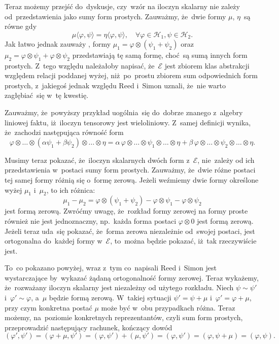 \documentclass[a4paper,11pt]{article}
\newcommand{\ld}{\ldots}
\newcommand{\mc}{\mathcal}
\newcommand{\al}{\alpha}
\newcommand{\vp}{\varphi}
\newcommand{\Hc}{\mc{H}}
\newcommand{\ot}{\otimes}
\newcommand{\lket}{\langle}
\newcommand{\rket}{\rangle}
\begin{document}
Teraz możemy przejść do~dyskusje, %
czy~wzór na iloczyn skalarny nie zależy od~przedstawienia jako sumy
form prostych. Zauważmy, że~dwie formy $\mu$, $\eta$~są równe gdy
\begin{displaymath}
  \mu\lket \vp, \psi \rket = \eta\lket \vp, \psi \rket,
  \quad \forall \vp \in \Hc_{ 1 }, \psi \in \Hc_{ 2 }.
\end{displaymath}
Jak łatwo jednak zauważy %
, formy $\mu_{ 1 } = \vp \ot ( \psi_{ 1 } + \psi_{ 2 } )$
oraz~$\mu_{ 2 } = \vp \ot \psi_{ 1 } + \vp \ot \psi_{ 2 }$
przedstawiają tę samą formę, choć~są sumą innych form prostych. Z~tego
względu należałoby napisać, że~$\mc{E}$ jest zbiorem klas abstrakcji
względem relacji poddanej wyżej, niż~po~prostu zbiorem sum
odpowiednich form prostych, z~jakiegoś jednak względu Reed i~Simon
uznali, że~nie warto zagłębiać~się w~tę kwestię.

Zauważmy, że~powyższy przykład uogólnia~się do~dobrze znanego
z~algebry liniowej faktu, iż~iloczyn tensorowy jest wieloliniowy.
Z~samej definicji wynika, że~zachodzi następująca równość form
\begin{displaymath}
  \vp \ot \ld \ot ( \al \psi_{ 1 } + \beta \psi_{ 2 } ) \ot \ld \ot \eta
  = \al \, \vp \ot \ld \ot \psi_{ 1 } \ot \ld \ot \eta
  + \beta \, \vp \ot \ld \ot \psi_{ 2 } \ot \ld \ot \eta.
\end{displaymath}

Musimy teraz pokazać, że~iloczyn skalarnych dwóch form z~$\mc{E}$,
nie~zależy od ich przedstawienia w~postaci sumy form prostych.
Zauważmy, że~dwie różne postaci tej samej formy różnią się o~formę
zerową. Jeżeli weźmiemy dwie formy określone wyżej $\mu_{ 1 }$
i~$\mu_{ 2 }$, to ich różnica:
\begin{displaymath}
  \mu_{ 1 } - \mu_{ 2 } = \vp \ot ( \psi_{ 1 } + \psi_{ 2 } )
  - \vp \ot \psi_{ 1 } - \vp \ot \psi_{ 2 }
\end{displaymath}
jest formą zerową. Zwróćmy uwagę, że~rozkład formy zerowej na formy
proste również nie jest jednoznaczny, np.~każda forma postaci
$\vp \ot 0$ jest formą zerową. Jeżeli teraz uda~się pokazać, że~forma
zerowa niezależnie od~swojej postaci, jest ortogonalna do~każdej formy
w~$\mc{E}$, to~można będzie pokazać, iż~tak rzeczywiście jest.

To~co pokazano powyżej, wraz z~tym co~napisali Reed i~Simon jest
wystarczające by~wykazać żądaną ortogonalność formy zerowej. Teraz
wykażemy, że~rozważany iloczyn skalarny jest niezależny od użytego
rozkładu. Niech $\psi \sim \psi'$ i~$\vp' \sim \vp$, a~$\mu$ będzie
formą zerową. W~takiej sytuacji $\psi' = \psi + \mu$
i~$\vp' = \vp + \mu$, przy czym konkretna postać $\mu$ może być w~obu
przypadkach różna. Teraz możemy, na~poziomie konkretnych
reprezentantów, czyli sum form prostych, przeprowadzić następujący
rachunek, kończący dowód
\begin{displaymath}
  ( \vp', \psi' ) = ( \vp + \mu, \psi' ) = ( \vp, \psi' ) + ( \mu, \psi' )
  = ( \vp, \psi' ) = ( \vp, \psi + \mu ) = ( \vp, \psi ).
\end{displaymath}
\end{document}
